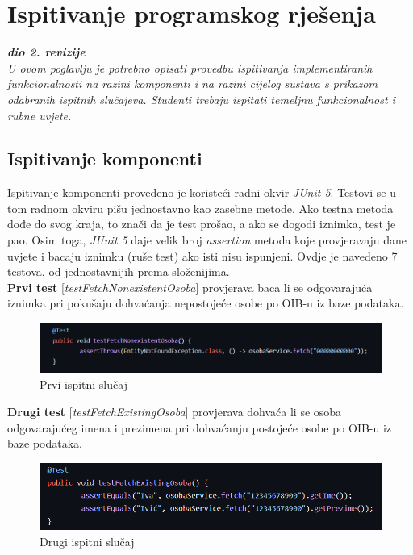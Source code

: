 			
			\eject 
		
	
		\section{Ispitivanje programskog rješenja}
			
			\textbf{\textit{dio 2. revizije}}\\
			
			 \textit{U ovom poglavlju je potrebno opisati provedbu ispitivanja implementiranih funkcionalnosti na razini komponenti i na razini cijelog sustava s prikazom odabranih ispitnih slučajeva. Studenti trebaju ispitati temeljnu funkcionalnost i rubne uvjete.}
	
			
			\subsection{Ispitivanje komponenti}
			Ispitivanje komponenti provedeno je koristeći radni okvir \textit{JUnit 5}. Testovi se u tom radnom okviru pišu jednostavno kao zasebne metode. Ako testna metoda dođe do svog kraja, to znači da je test prošao, a ako se dogodi iznimka, test je pao. Osim toga, \textit{JUnit 5} daje velik broj \textit{assertion} metoda koje provjeravaju dane uvjete i bacaju iznimku (ruše test) ako isti nisu ispunjeni. Ovdje je navedeno 7 testova, od jednostavnijih prema složenijima. \\
			
			\noindent \textbf{Prvi test} [\textit{testFetchNonexistentOsoba}] provjerava baca li se odgovarajuća iznimka pri pokušaju dohvaćanja nepostojeće osobe po OIB-u iz baze podataka. 
			\begin{figure}[H]
				\includegraphics[width=\textwidth]{slike/junit_1.png}
				\caption{Prvi ispitni slučaj}
				\label{fig:junit_1}
			\end{figure}
			\noindent \textbf{Drugi test} [\textit{testFetchExistingOsoba}] provjerava dohvaća li se osoba odgovarajućeg imena i prezimena pri dohvaćanju postojeće osobe po OIB-u iz baze podataka.
			\begin{figure}[H]
				\includegraphics[width=\textwidth]{slike/junit_2.png}
				\caption{Drugi ispitni slučaj}
				\label{fig:junit_2}
			\end{figure}
			
